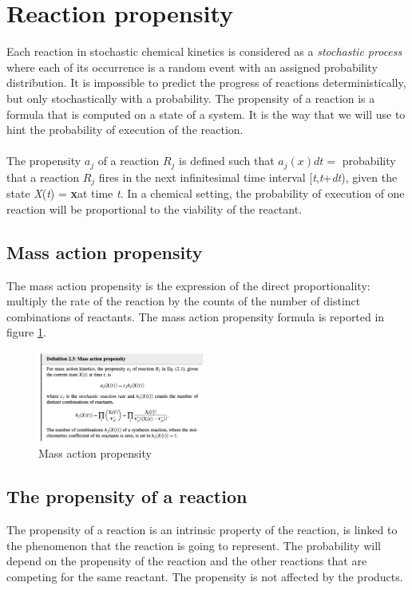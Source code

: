 \section{Reaction propensity}
Each reaction in stochastic chemical kinetics is considered as a \emph{stochastic process} where each of its occurrence is a random event with an assigned probability distribution.
It is impossible to predict the progress of reactions deterministically, but only stochastically with a probability.
The propensity of a reaction is a formula that is computed on a state of a system.
It is the way that we will use to hint the probability of execution of the reaction.
\\
\\
\noindent
The propensity $a_j$ of a reaction $R_j$ is defined such that $a_j(x)dt=$ probability that a reaction $ R_j$ fires in the next infinitesimal time interval {[}\emph{t},\emph{t}+\emph{dt}), given the state \emph{X}(\emph{t}) = \textbf{x}at time \emph{t}.
In a chemical setting, the probability of execution of one reaction will be proportional to the viability of the reactant.

\subsection{Mass action propensity}
The mass action propensity is the expression of the direct proportionality: multiply the rate of the reaction by the counts of the number of distinct combinations of reactants. The mass action propensity formula is reported in figure \ref{fig:massaction}.

  \begin{figure}
    \centering
    \includegraphics[width=0.5\textwidth]{massaction.png}
    \caption{Mass action propensity}
    \label{fig:massaction}
  \end{figure}

\subsection{The propensity of a reaction}
The propensity of a reaction is an intrinsic property of the reaction, is linked to the phenomenon that the reaction is going to represent.
The probability will depend on the propensity of the reaction and the other reactions that are competing for the same reactant.
The propensity is not affected by the products.

